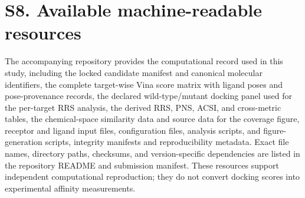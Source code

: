 \documentclass[journal=jcisd8,manuscript=suppinfo]{achemso}
\begin{document}
\section*{S8. Available machine-readable resources}
The accompanying repository provides the computational record used in this study, including the locked candidate manifest and canonical molecular identifiers, the complete target-wise Vina score matrix with ligand poses and pose-provenance records, the declared wild-type/mutant docking panel used for the per-target RRS analysis, the derived RRS, PNS, ACSI, and cross-metric tables, the chemical-space similarity data and source data for the coverage figure, receptor and ligand input files, configuration files, analysis scripts, and figure-generation scripts, integrity manifests and reproducibility metadata. Exact file names, directory paths, checksums, and version-specific dependencies are listed in the repository README and submission manifest. These resources support independent computational reproduction; they do not convert docking scores into experimental affinity measurements.


\end{document}
